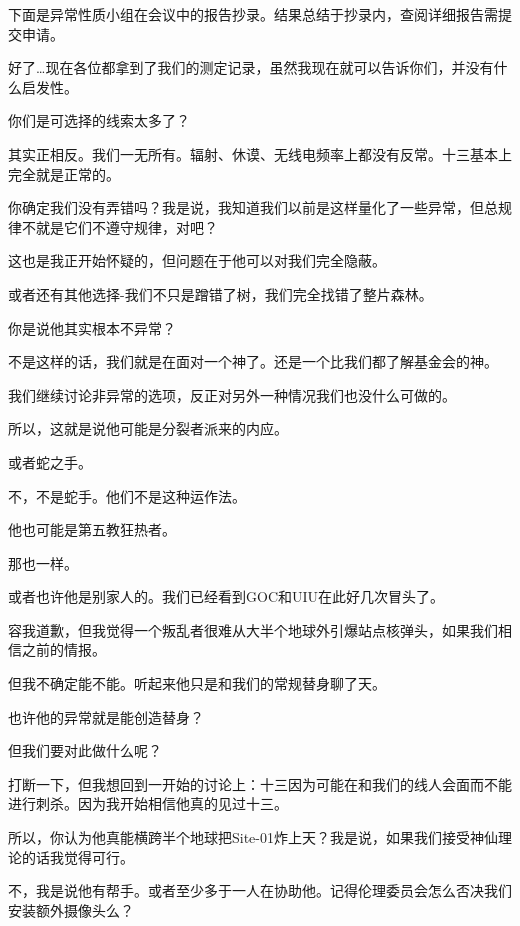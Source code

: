 下面是异常性质小组在会议中的报告抄录。结果总结于抄录内，查阅详细报告需提交申请。

\begin{scpbox}


好了…现在各位都拿到了我们的测定记录，虽然我现在就可以告诉你们，并没有什么启发性。

你们是可选择的线索太多了？

其实正相反。我们一无所有。辐射、休谟、无线电频率上都没有反常。十三基本上完全就是正常的。

你确定我们没有弄错吗？我是说，我知道我们以前是这样量化了一些异常，但总规律不就是它们不遵守规律，对吧？

这也是我正开始怀疑的，但问题在于他可以对我们完全隐蔽。

或者还有其他选择-我们不只是蹭错了树，我们完全找错了整片森林。

你是说他其实根本不异常？

不是这样的话，我们就是在面对一个神了。还是一个比我们都了解基金会的神。

我们继续讨论非异常的选项，反正对另外一种情况我们也没什么可做的。

所以，这就是说他可能是分裂者派来的内应。

或者蛇之手。

不，不是蛇手。他们不是这种运作法。

他也可能是第五教狂热者。

那也一样。

或者也许他是别家人的。我们已经看到GOC和UIU在此好几次冒头了。

容我道歉，但我觉得一个叛乱者很难从大半个地球外引爆站点核弹头，如果我们相信之前的情报。

但我不确定能不能。听起来他只是和我们的常规替身聊了天。

也许他的异常就是能创造替身？

但我们要对此做什么呢？

打断一下，但我想回到一开始的讨论上：十三因为可能在和我们的线人会面而不能进行刺杀。因为我开始相信他真的见过十三。

所以，你认为他真能横跨半个地球把Site-01炸上天？我是说，如果我们接受神仙理论的话我觉得可行。

不，我是说他有帮手。或者至少多于一人在协助他。记得伦理委员会怎么否决我们安装额外摄像头么？


\end{scpbox}
